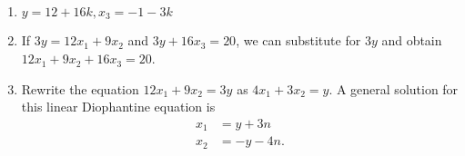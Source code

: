 \begin{list}{\bf{\ref{exer:lindioph3}.}}
\item \begin{enumerate}
\item $y = 12 + 16k, x_3 = -1 - 3k$

\item If $3y = 12x_1 + 9x_2$ and $3y + 16x_3 = 20$, we can substitute for $3y$ and obtain 
$12x_1 + 9x_2 + 16x_3 = 20$.

\item Rewrite the equation $12x_1 + 9x_2 = 3y$ as $4x_1 + 3x_2 = y$.  A general solution for this linear Diophantine equation is
\begin{align*}
x_1 &= y + 3n \\
x_2 &= -y - 4n. \\
\end{align*}
\end{enumerate}
\end{list}
\hbreak
\endinput


